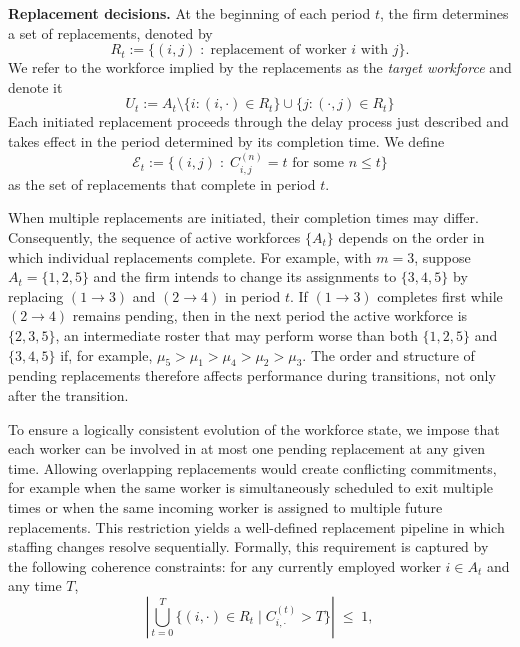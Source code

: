 \documentclass[opre,blindrev]{informs3}
\begin{document}
{\bf Replacement decisions.}
At the beginning of each period \(t\), the firm determines a set of replacements, denoted by 
\[
    R_t := \{(i,j) \;:\; \text{replacement of worker \(i\) with \(j\)}\}.
\]
We refer to the workforce implied by the replacements as the \emph{target workforce} and denote it
\[
    U_t:= A_t \setminus \{i: (i,\cdot) \in R_t\} \cup \{j: (\cdot, j) \in R_t\}
\]
Each initiated replacement proceeds through the delay process just described and takes effect in the period determined by its completion time. We define
\[
    \mathcal{E}_t := \{(i,j) \;:\; C_{i,j}^{(n)} = t \text{ for some } n \le t\}
\]
as the set of replacements that complete in period \(t\). 
\begin{remark}\label{ex:intermediate-set}
    When multiple replacements are initiated, their completion times may differ. Consequently, the sequence of active workforces \(\{A_t\}\) depends on the order in which individual replacements complete. For example, with \(m=3\), suppose \(A_t=\{1,2, 5\}\) and the firm intends to change its assignments to \(\{3,4, 5\}\) by replacing \((1\to 3)\) and \((2\to 4)\) in period \(t\). If \((1\to 3)\) completes first while \((2\to 4)\) remains pending, then in the next period the active workforce is \(\{2,3,5\}\), an intermediate roster that may perform worse than both \(\{1,2, 5\}\) and \(\{3,4, 5\}\) if, for example, \(\mu_5>\mu_1 > \mu_4 > \mu_2 > \mu_3\). The order and structure of pending replacements therefore affects performance during transitions, not only after the transition.
\end{remark}
To ensure a logically consistent evolution of the workforce state, we impose that each worker can be involved in at most one pending replacement at any given time. Allowing overlapping replacements would create conflicting commitments, for example when the same worker is simultaneously scheduled to exit multiple times or when the same incoming worker is assigned to multiple future replacements. This restriction yields a well-defined replacement pipeline in which staffing changes resolve sequentially. Formally, this requirement is captured by the following coherence constraints: for any currently employed worker \(i \in A_t\) and any time \(T\),
\begin{equation}\label{eq:coherence-1}
    \left|\bigcup_{t=0}^T\{(i,\cdot)\in R_t \mid C_{i,\cdot}^{(t)}>T\}\right|\;\leq\; 1,
\end{equation}
\end{document}
